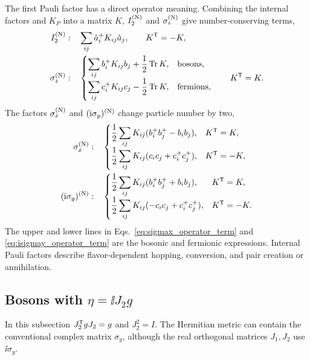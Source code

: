 The first Pauli factor has a direct operator meaning.  Combining the internal factors and \(K_P\) into a matrix \(K\), \(I_2^{({\rm N})}\) and \(\sigma_z^{({\rm N})}\) give number-conserving terms,
\begin{align}
I_2^{({\rm N})}:&\quad \sum_{ij}\hat a_i^+K_{ij}\hat a_j,
\qquad K^{\mathsf{T}}=-K,
\label{eq:I_operator_term}\\
\sigma_z^{({\rm N})}:&\quad
\begin{cases}
\displaystyle \sum_{ij}b_i^+K_{ij}b_j+\frac12\operatorname{Tr} K,&\text{bosons},\\[3pt]
\displaystyle \sum_{ij}c_i^+K_{ij}c_j-\frac12\operatorname{Tr} K,&\text{fermions},
\end{cases}
\qquad K^{\mathsf{T}}=K.
\label{eq:sigmaz_operator_term}
\end{align}
The factors \(\sigma_x^{({\rm N})}\) and \((\mathrm{i}\sigma_y)^{({\rm N})}\) change particle number by two,
\begin{align}
\sigma_x^{({\rm N})}:&\quad
\begin{cases}
\displaystyle \frac12\sum_{ij}K_{ij}(b_i^+b_j^+-b_ib_j),&K^{\mathsf{T}}=K,\\[3pt]
\displaystyle \frac12\sum_{ij}K_{ij}(c_ic_j+c_i^+c_j^+),&K^{\mathsf{T}}=-K,
\end{cases}
\label{eq:sigmax_operator_term}\\
(\mathrm{i}\sigma_y)^{({\rm N})}:&\quad
\begin{cases}
\displaystyle \frac12\sum_{ij}K_{ij}(b_i^+b_j^++b_ib_j),&K^{\mathsf{T}}=K,\\[3pt]
\displaystyle \frac12\sum_{ij}K_{ij}(-c_ic_j+c_i^+c_j^+),&K^{\mathsf{T}}=-K.
\end{cases}
\label{eq:isigmay_operator_term}
\end{align}
The upper and lower lines in Eqs.~\eqref{eq:sigmax_operator_term} and \eqref{eq:isigmay_operator_term} are the bosonic and fermionic expressions.  Internal Pauli factors describe flavor-dependent hopping, conversion, and pair creation or annihilation.

\subsection{Bosons with \texorpdfstring{\(\eta=\ii J_2g\)}{eta = i J2 g}}

In this subsection \(J_2^{\mathsf{T}} gJ_2=g\) and \(J_2^2=I\).  The Hermitian metric can contain the conventional complex matrix \(\sigma_y\), although the real orthogonal matrices \(J_1,J_2\) use \(\ii\sigma_y\).

